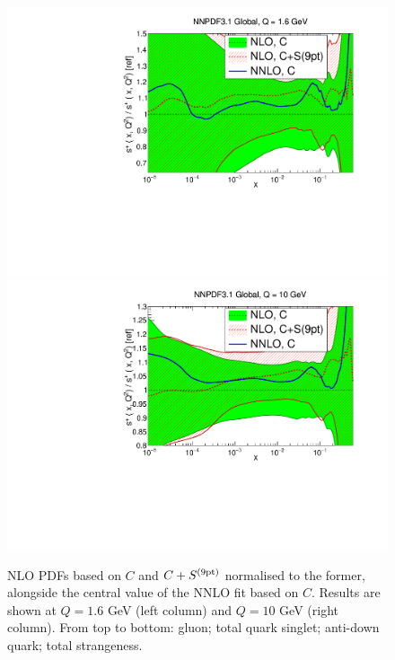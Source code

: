 \begin{figure}[H]
\begin{center}
       \includegraphics[scale=0.35]{mhous/plots/xsp-Global-NLO-CovMatTH-EXP-vsTH16.pdf}
   \includegraphics[scale=0.35]{mhous/plots/xsp-Global-NLO-CovMatTH-EXP-vsTH.pdf}

   \caption{\small NLO PDFs based on $C$ and $C+S^{\rm (9pt)}$ normalised
     to the former, alongside the central value of the NNLO fit based on $C$.
     Results are shown at $Q=1.6$ GeV (left column) and $Q=10$ GeV (right column). From top to bottom: gluon; total quark singlet;
     anti-down quark; total strangeness.
    \label{fig:Global-NLO-CovMatTH} }
  \end{center}
\end{figure}
